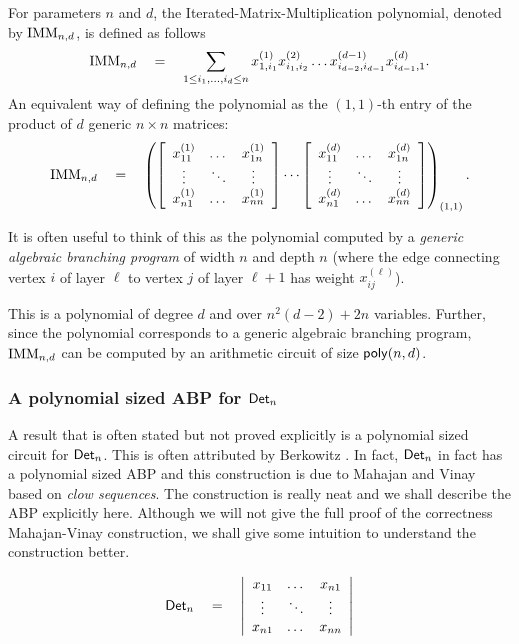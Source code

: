 For parameters $n$ and $d$, the Iterated-Matrix-Multiplication polynomial, denoted by $\mathrm{IMM}_{n,d}$, is defined as follows
$$
\mathrm{IMM}_{n,d} \quad = \quad \sum_{1\leq i_1,\dots, i_d\leq n} x_{1,i_1}^{(1)}x_{i_1,i_2}^{(2)}\dots x_{i_{d-2},i_{d-1}}^{(d-1)}x_{i_{d-1},1}^{(d)}.
$$
An equivalent way of defining the polynomial as the $(1,1)$-th entry of the product of $d$ generic $n\times n$ matrices:
$$
\mathrm{IMM}_{n,d} \quad = \quad \left(\left[\begin{array}{ccc} x_{11}^{(1)} & \dots & x_{1n}^{(1)}\\ \vdots & \ddots & \vdots \\ x_{n1}^{(1)} & \dots & x_{nn}^{(1)}\end{array}\right] \cdots \left[\begin{array}{ccc} x_{11}^{(d)} & \dots & x_{1n}^{(d)}\\ \vdots & \ddots & \vdots \\ x_{n1}^{(d)} & \dots & x_{nn}^{(d)}\end{array}\right]\right)_{(1,1)}.
$$

It is often useful to think of this as the polynomial computed by a \emph{generic algebraic branching program} of width $n$ and depth $n$ (where the edge connecting vertex $i$ of layer $\ell$ to vertex $j$ of layer $\ell+1$ has weight $x_{ij}^{(\ell)}$). 

This is a polynomial of degree $d$ and over $n^2(d-2) + 2n$ variables. Further, since the polynomial corresponds to a generic algebraic branching program, $\mathrm{IMM}_{n,d}$ can be computed by an arithmetic circuit of size $\mathsf{poly}(n,d)$. \\


\subsubsection*{A polynomial sized ABP for $\mathsf{Det}_n$}

A result that is often stated but not proved explicitly is a polynomial sized circuit for $\mathsf{Det}_n$. This is often attributed by Berkowitz \cite{Berk84}. In fact, $\mathsf{Det}_n$ in fact has a polynomial sized ABP and this construction is due to Mahajan and Vinay~\cite{mv97} based on \emph{clow sequences}. The construction is really neat and we shall describe the ABP explicitly here. Although we will not give the full proof of the correctness Mahajan-Vinay construction, we shall give some intuition to understand the construction better. 

\[
\mathsf{Det}_n \quad = \quad \left|\begin{array}{ccc}
x_{11} & \dots & x_{n1}\\
\vdots & \ddots & \vdots \\
x_{n1} & \dots & x_{nn}
\end{array}
\right|\]

